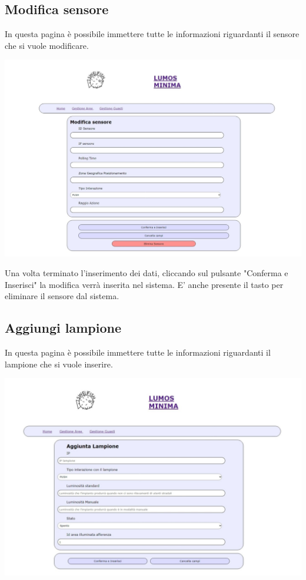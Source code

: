 \documentclass[9pt]{article}
\begin{document}
\subsection{Modifica sensore}
In questa pagina è possibile immettere tutte le informazioni riguardanti il sensore che si vuole modificare.

\begin{center}
	\includegraphics[scale=0.3]{Modifica_sensore.png}
\end{center}

Una volta terminato l'inserimento dei dati, cliccando sul pulsante "Conferma e Inserisci"
la modifica verrà inserita nel sistema.
E' anche presente il tasto per eliminare il sensore dal sistema.


\subsection{Aggiungi lampione}
In questa pagina è possibile immettere tutte le informazioni riguardanti il lampione che si vuole inserire.

\begin{center}
	\includegraphics[scale=0.3]{Aggiungi_lampione.png}
\end{center}
\end{document}

